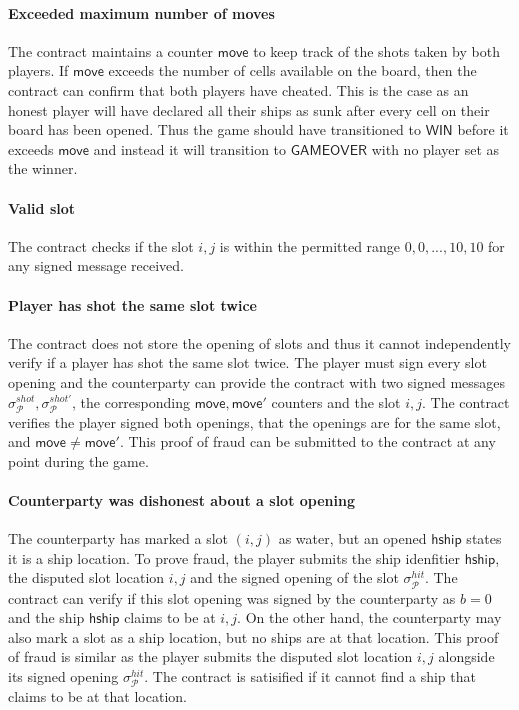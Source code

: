 \documentclass{llncs}
\newcommand{\gamewinner}{\mathsf{WIN}}
\newcommand{\gamefinished}{\mathsf{GAMEOVER}}
\newcommand{\hship}{\mathsf{hship}}
\newcommand{\participant}{\mathcal{P}}
\begin{document}
\paragraph{Exceeded maximum number of moves} 
The contract maintains a counter $\mathsf{move}$ to keep track of the shots taken by both players. 
If $\mathsf{move}$ exceeds the number of cells available on the board, then the contract can confirm that both players have cheated.
This is the case as an honest player will have declared all their ships as sunk after every cell on their board has been opened.
Thus the game should have transitioned to $\gamewinner$ before it exceeds $\mathsf{move}$ and instead it will transition to $\gamefinished$ with no player set as the winner. 

\paragraph{Valid slot} 
The contract checks if the slot $i,j$ is within the permitted range $0,0,...,10,10$ for any signed message received. 

\paragraph{Player has shot the same slot twice} 
The contract does not store the opening of slots and thus it cannot independently verify if a player has shot the same slot twice.
The player must sign every slot opening and the counterparty can provide the contract with two signed messages $\sigma^{shot}_{\participant},\sigma^{shot'}_{\participant}$, the corresponding $\mathsf{move},\mathsf{move}'$ counters and the slot $i,j$. 
The contract verifies the player signed both openings, that the openings are for the same slot, and $\mathsf{move}\neq\mathsf{move}'$. 
This proof of fraud can be submitted to the contract at any point during the game. 

\paragraph{Counterparty was dishonest about a slot opening}
The counterparty has marked a slot $(i,j)$ as water, but an opened $\hship$ states it is a ship location. 
To prove fraud, the player submits the ship idenfitier $\hship$, the disputed slot location $i,j$ and the signed opening of the slot $\sigma^{hit}_{\participant}$. 
The contract can verify if this slot opening was signed by the counterparty as $b = 0$ and the ship $\hship$ claims to be at $i,j$.   
On the other hand, the counterparty may also mark a slot as a ship location,  but no ships are at that location.
This proof of fraud is similar as the player submits the disputed slot location $i,j$ alongside its signed opening $\sigma^{hit}_{\participant}$.
The contract is satisified if it cannot find a ship that claims to be at that location. 
\end{document}
